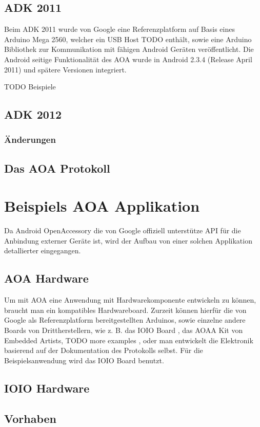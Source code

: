 \documentclass[12pt,journal,compsoc]{IEEEtran}
\begin{document}
\subsection{ADK 2011}
Beim ADK 2011 wurde von Google eine
Referenzplatform auf Basis eines Arduino Mega 2560, welcher ein USB Host TODO enthält, sowie eine Arduino Bibliothek zur Kommunikation mit fähigen Android Geräten veröffentlicht.
Die Android seitige Funktionalität des AOA wurde in Android 2.3.4 (Release April 2011) und spätere Versionen integriert. 

TODO Beispiele
\subsection{ADK 2012}
\subsubsection{Änderungen}

\subsection{Das AOA Protokoll}

\section{Beispiels AOA Applikation}
Da Android OpenAccessory die von Google offiziell unterstütze API für die Anbindung externer Geräte ist, wird der Aufbau von einer solchen Applikation detallierter eingegangen.
\subsection{AOA Hardware}
Um mit AOA eine Anwendung mit Hardwarekomponente entwickeln zu können, braucht man ein kompatibles Hardwareboard.
Zurzeit können hierfür die von Google als Referenzplatform bereitgestellten Arduinos, sowie einzelne andere Boards von Drittherstellern, wie z. B. das IOIO Board \cite{ioio}, das AOAA Kit von Embedded Artists\cite{aoaa},  TODO more examples , oder man entwickelt die Elektronik basierend auf der Dokumentation des Protokolls selbst\cite{aoaprotocol2}.
Für die Beispielsanwendung wird das IOIO Board benutzt.
\subsection{IOIO Hardware}

\subsection{Vorhaben}
\end{document}
